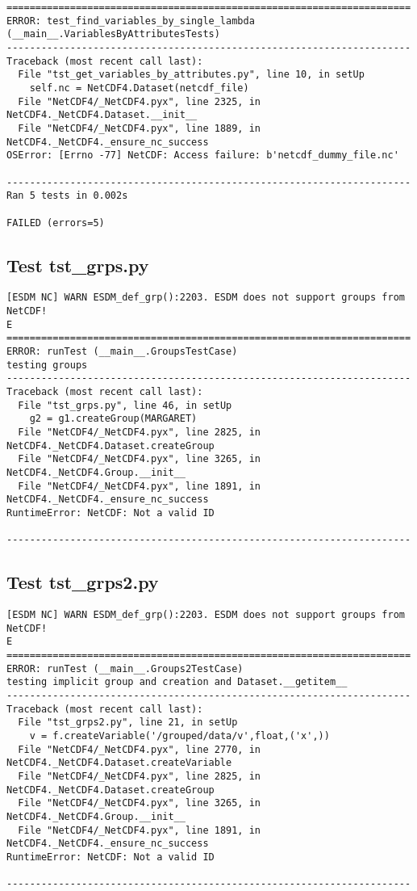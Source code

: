 \begin{verbatim}
======================================================================
ERROR: test_find_variables_by_single_lambda (__main__.VariablesByAttributesTests)
----------------------------------------------------------------------
Traceback (most recent call last):
  File "tst_get_variables_by_attributes.py", line 10, in setUp
    self.nc = NetCDF4.Dataset(netcdf_file)
  File "NetCDF4/_NetCDF4.pyx", line 2325, in NetCDF4._NetCDF4.Dataset.__init__
  File "NetCDF4/_NetCDF4.pyx", line 1889, in NetCDF4._NetCDF4._ensure_nc_success
OSError: [Errno -77] NetCDF: Access failure: b'netcdf_dummy_file.nc'

----------------------------------------------------------------------
Ran 5 tests in 0.002s

FAILED (errors=5)
\end{verbatim}

\subsection{Test tst\_grps.py}

\begin{verbatim}
[ESDM NC] WARN ESDM_def_grp():2203. ESDM does not support groups from NetCDF!
E
======================================================================
ERROR: runTest (__main__.GroupsTestCase)
testing groups
----------------------------------------------------------------------
Traceback (most recent call last):
  File "tst_grps.py", line 46, in setUp
    g2 = g1.createGroup(MARGARET)
  File "NetCDF4/_NetCDF4.pyx", line 2825, in NetCDF4._NetCDF4.Dataset.createGroup
  File "NetCDF4/_NetCDF4.pyx", line 3265, in NetCDF4._NetCDF4.Group.__init__
  File "NetCDF4/_NetCDF4.pyx", line 1891, in NetCDF4._NetCDF4._ensure_nc_success
RuntimeError: NetCDF: Not a valid ID

----------------------------------------------------------------------
\end{verbatim}

\subsection{Test tst\_grps2.py}

\begin{verbatim}
[ESDM NC] WARN ESDM_def_grp():2203. ESDM does not support groups from NetCDF!
E
======================================================================
ERROR: runTest (__main__.Groups2TestCase)
testing implicit group and creation and Dataset.__getitem__
----------------------------------------------------------------------
Traceback (most recent call last):
  File "tst_grps2.py", line 21, in setUp
    v = f.createVariable('/grouped/data/v',float,('x',))
  File "NetCDF4/_NetCDF4.pyx", line 2770, in NetCDF4._NetCDF4.Dataset.createVariable
  File "NetCDF4/_NetCDF4.pyx", line 2825, in NetCDF4._NetCDF4.Dataset.createGroup
  File "NetCDF4/_NetCDF4.pyx", line 3265, in NetCDF4._NetCDF4.Group.__init__
  File "NetCDF4/_NetCDF4.pyx", line 1891, in NetCDF4._NetCDF4._ensure_nc_success
RuntimeError: NetCDF: Not a valid ID

----------------------------------------------------------------------
\end{verbatim}

